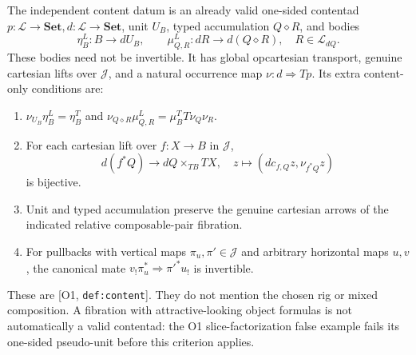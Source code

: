 \documentclass[11pt,a4paper]{article}
\theoremstyle{definition}
\newcommand{\Set}{\mathbf{Set}}
\newcommand{\J}{\mathcal J}
\newcommand{\Lc}{\mathcal L}
\newcommand{\Addr}[2]{\textup{[#1, \texttt{#2}]}}
\begin{document}
The independent content datum is an already valid one-sided contentad
\(p:\Lc\to\Set,d:\Lc\to\Set\), unit \(U_B\), typed accumulation
\(Q\diamond R\), and bodies
\[
 \eta^L_B:B\to dU_B,\qquad
 \mu^L_{Q,R}:dR\to d(Q\diamond R),\quad R\in\Lc_{dQ}.
\]
These bodies need not be invertible. It has global opcartesian transport,
genuine cartesian lifts over \(\J\), and a natural occurrence map
\(\nu:d\Rightarrow Tp\). Its extra content-only conditions are:
\begin{enumerate}[label=\textup{L\arabic*.},start=3]
\item \(\nu_{U_B}\eta^L_B=\eta^T_B\) and
\(\nu_{Q\diamond R}\mu^L_{Q,R}=\mu^T_BT\nu_Q\nu_R\).
\item For each cartesian lift over \(f:X\to B\) in \(\J\),
\[
 d(f^*Q)\longrightarrow dQ\times_{TB}TX,
 \quad z\longmapsto(dc_{f,Q}z,\nu_{f^*Q}z)
\]
is bijective.
\item Unit and typed accumulation preserve the genuine cartesian arrows
of the indicated relative composable-pair fibration.
\item For pullbacks with vertical maps \(\pi_u,\pi'\in\J\) and
arbitrary horizontal maps \(u,v\), the canonical mate
\(v_!\pi_u^*\Rightarrow\pi'^*u_!\) is invertible.
\end{enumerate}
These are \Addr{O1}{def:content}. They do not mention the chosen rig or
mixed composition. A fibration with attractive-looking object formulas is
not automatically a valid contentad: the O1 slice-factorization false
example fails its one-sided pseudo-unit before this criterion applies.
\end{document}
